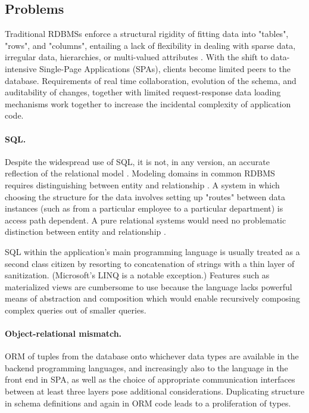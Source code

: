 \subsection{Problems}

Traditional RDBMSs enforce a structural rigidity of fitting data into "tables", "rows", and "columns", entailing a lack of flexibility in dealing with sparse data, irregular data, hierarchies, or multi-valued attributes \cite{hickey2012dbvalue}. With the shift to data-intensive Single-Page Applications (SPAs), clients become limited peers to the database. Requirements of real time collaboration, evolution of the schema, and auditability of changes, together with limited request-response data loading mechanisms work together to increase the incidental complexity of application code.


\paragraph{\gls{SQL}.}
Despite the widespread use of SQL, it is not, in any version, an accurate reflection of the relational model \cite{codd1990relational} \cite{tarpit}.
Modeling domains in common \gls{RDBMS} requires distinguishing between entity and relationship \cite{chen1976entity}. A system in which choosing the structure for the data involves setting up "routes" between data instances (such as from a particular employee to a particular department) is access path dependent. A pure relational systems would need no problematic distinction between entity and relationship \cite{tarpit}.

SQL within the application's main programming language is usually treated as a second class citizen by resorting to concatenation of strings with a thin layer of sanitization. (Microsoft's LINQ \cite{meijer2006linq} is a notable exception.) Features such as materialized views are cumbersome to use because the language lacks powerful means of abstraction and composition \cite{sicp} which would enable recursively composing complex queries out of smaller queries.

\paragraph{Object-relational mismatch.}
\gls{ORM} of tuples from the database onto whichever data types are available in the backend programming languages, and increasingly also to the language in the front end in \gls{SPA}, as well as the choice of appropriate communication interfaces between at least three layers pose additional considerations. Duplicating structure in schema definitions and again in ORM code leads to a proliferation of types.

